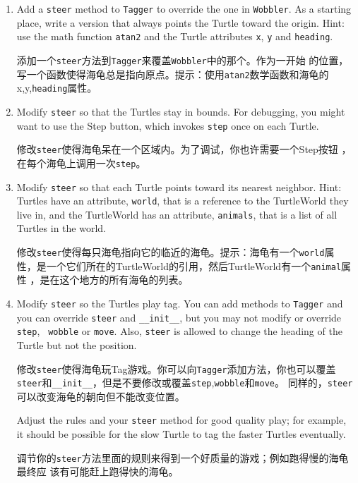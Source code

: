 \documentclass[10pt]{book}
\begin{document}
\begin{CJK}{UTF8}{gbsn}
\begin{exercise}
\begin{enumerate}
\item Add a {\tt steer} method to {\tt Tagger} to override the one in
  {\tt Wobbler}.  As a starting place, write a version that always
  points the Turtle toward the origin.  Hint: use the math function
  {\tt atan2} and the Turtle attributes {\tt x}, {\tt y} and
  {\tt heading}.

  添加一个{\tt steer}方法到{\tt Tagger}来覆盖{\tt Wobbler}中的那个。作为一开始
  的位置，写一个函数使得海龟总是指向原点。提示：使用{\tt atan2}数学函数和海龟的
  x,y,{\tt heading}属性。

\item Modify {\tt steer} so that the Turtles stay in bounds.
  For debugging, you might want to use the {\sf Step} button,
  which invokes {\tt step} once on each Turtle.

  修改{\tt steer}使得海龟呆在一个区域内。为了调试，你也许需要一个{\sf Step}按钮
  ，在每个海龟上调用一次{\tt step}。

\item Modify {\tt steer} so that each Turtle points toward its nearest
  neighbor.  Hint: Turtles have an attribute, {\tt world}, that is a
  reference to the TurtleWorld they live in, and the TurtleWorld has
  an attribute, {\tt animals}, that is a list of all Turtles in the
  world.

  修改{\tt steer}使得每只海龟指向它的临近的海龟。提示：海龟有一个{\tt world}属
  性，是一个它们所在的TurtleWorld的引用，然后TurtleWorld有一个{\tt animal}属性
  ，是在这个地方的所有海龟的列表。

\item Modify {\tt steer} so the Turtles play tag.  You can add methods
  to {\tt Tagger} and you can override {\tt steer} and
  \verb"__init__", but you may not modify or override {\tt step}, {\tt
    wobble} or {\tt move}.  Also, {\tt steer} is allowed to change the
  heading of the Turtle but not the position.

  修改{\tt steer}使得海龟玩Tag游戏。你可以向{\tt Tagger}添加方法，你也可以覆盖
  {\tt steer}和\verb"__init__"，但是不要修改或覆盖{\tt step},{\tt wobble}和{\tt move}。
  同样的，{\tt steer}可以改变海龟的朝向但不能改变位置。

Adjust the rules and your {\tt steer} method for good quality play;
for example, it should be possible for the slow Turtle to tag the
faster Turtles eventually.

调节你的{\tt steer}方法里面的规则来得到一个好质量的游戏；例如跑得慢的海龟最终应
该有可能赶上跑得快的海龟。


\end{enumerate}
\end{exercise}
\end{CJK}
\end{document}
